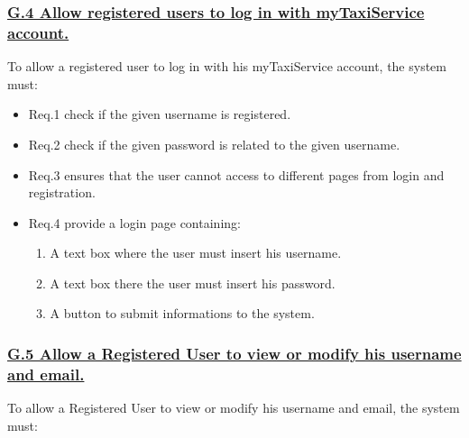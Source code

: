 \documentclass{report}
\begin{document}
			\subsubsection{\lbrack \hyperref[sec:g4]{G.4 Allow registered users to log in with myTaxiService account.}\rbrack}\label{sec:frs4}
			To allow a registered user to log in with his myTaxiService account, the system must:

				\begin{itemize}
					\item \lbrack Req.1\rbrack \label{sec:fr1_g4} check if the given username is registered.
					\item \lbrack Req.2\rbrack \label{sec:fr2_g4} check if the given password is related to the given username.
					\item \lbrack Req.3\rbrack \label{sec:fr3_g4} ensures that the user cannot access to different pages from login and registration.
					\item \lbrack Req.4\rbrack \label{sec:fr4_g4} provide a login page containing:
						\begin{enumerate}
							\item A text box where the user must insert his username.
							\item A text box there the user must insert his password.
							\item A button to submit informations to the system.
						\end{enumerate}
				\end{itemize}

			\subsubsection{\lbrack \hyperref[sec:g5]{G.5 Allow a Registered User to view or modify his username and email.}\rbrack}\label{sec:frs5}
			To allow a Registered User to view or modify his username and email, the system must:
\end{document}
